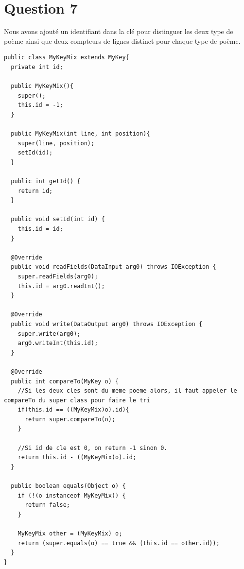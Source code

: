 \documentclass{article}
\begin{document}
  \section*{Question 7} 

    Nous avons ajouté un identifiant dans la clé pour distinguer les deux type
    de poème ainsi que deux compteurs de lignes distinct pour chaque type de
    poème. \medskip
 
\begin{lstlisting}
public class MyKeyMix extends MyKey{
  private int id;
	
  public MyKeyMix(){
    super();
    this.id = -1;
  }
  
  public MyKeyMix(int line, int position){
    super(line, position);
    setId(id);
  }
	
  public int getId() {
    return id;
  }

  public void setId(int id) {
    this.id = id;
  }
  
  @Override
  public void readFields(DataInput arg0) throws IOException {
    super.readFields(arg0);
    this.id = arg0.readInt();  
  }

  @Override
  public void write(DataOutput arg0) throws IOException {
    super.write(arg0);	
    arg0.writeInt(this.id);		
  }
	
  @Override
  public int compareTo(MyKey o) {
    //Si les deux cles sont du meme poeme alors, il faut appeler le compareTo du super class pour faire le tri
    if(this.id == ((MyKeyMix)o).id){
      return super.compareTo(o);
    }
		
    //Si id de cle est 0, on return -1 sinon 0.
    return this.id - ((MyKeyMix)o).id;
  }

  public boolean equals(Object o) {
    if (!(o instanceof MyKeyMix)) {
      return false;
    }
		
    MyKeyMix other = (MyKeyMix) o;
    return (super.equals(o) == true && (this.id == other.id));
  }
}
\end{lstlisting}
\end{document}
